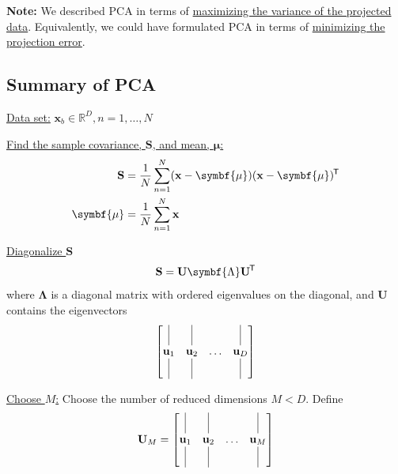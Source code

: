 \documentclass[11pt]{article}
\newcounter{descriptcount}
\newcommand{\xb}{\mathbf{x}}
\newcommand{\ub}{\symbf{\mu}}
\newcommand*{\tran}{^{\mkern-1.5mu\mathsf{T}}}
\newenvironment{propertybox}{%
   \def\FrameCommand{\colorbox{LightSteelBlue}}%
   \MakeFramed{\advance\hsize-\width \FrameRestore}}
 {\endMakeFramed}
\begin{document}
\begin{propertybox}
  \textbf{Note:} We described PCA in terms of \underline{maximizing the
  variance of the projected data}. Equivalently, we could have formulated PCA
  in terms of \underline{minimizing the projection error}.
\end{propertybox}

\begin{framed}
\subsection{Summary of PCA}
\begin{description}[%
  before={\setcounter{descriptcount}{0}},%
  ,font=\bfseries\stepcounter{descriptcount}\thedescriptcount.~]

  \item{\underline{Data set:}} $\xb_b \in \mathbb{R}^D, n = 1, \ldots, N$

  \item{\underline{Find the sample covariance, $\mathbf{S}$, and
    mean, $\ub$:}}
    \begin{align*}
      \mathbf{S} &= \frac{1}{N} \sum_{n=1}^N (\xb-\ub) (\xb-\ub)\tran \\
      \ub &= \frac{1}{N} \sum_{n=1}^N \xb
    \end{align*}

  \item{\underline{Diagonalize $\mathbf{S}$}}
    \begin{equation*}
      \mathbf{S} = \mathbf{U} \symbf{\Lambda} \mathbf{U}\tran
    \end{equation*}
    where $\symbf{\Lambda}$ is a diagonal matrix with ordered eigenvalues on the
    diagonal, and $\mathbf{U}$ contains the eigenvectors
    \begin{equation*}
      \begin{bmatrix}
        \vline height 1.5 em & \vline &   & \vline \\
        \mathbf{u}_1 & \mathbf{u}_2 & \ldots & \mathbf{u}_D \\
        \vline  height 1.5 em & \vline &   & \vline
      \end{bmatrix}
    \end{equation*}
  \item{\underline{Choose $M$:}}
    Choose the number of reduced dimensions $M < D$. Define
    \begin{equation*}
      \mathbf{U}_M =
      \begin{bmatrix}
        \vline height 1.5 em & \vline &   & \vline \\
        \mathbf{u}_1 & \mathbf{u}_2 & \ldots & \mathbf{u}_M \\
        \vline  height 1.5 em & \vline &   & \vline
      \end{bmatrix}
    \end{equation*}


\end{description}
\end{framed}
\end{document}
